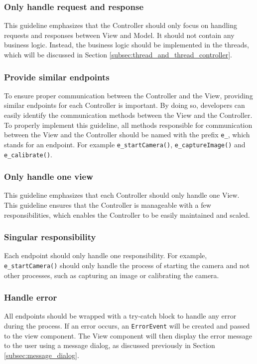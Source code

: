 \subsubsection{Only handle request and response}
This guideline emphasizes that the Controller should only focus on handling requests and responses between View and Model. It should not contain any business logic. Instead, the business logic should be implemented in the threads, which will be discussed in Section \ref{subsec:thread_and_thread_controller}.

\subsubsection{Provide similar endpoints}
To ensure proper communication between the Controller and the View, providing similar endpoints for each Controller is important. By doing so, developers can easily identify the communication methods between the View and the Controller. To properly implement this guideline, all methods responsible for communication between the View and the Controller should be named with the prefix \texttt{e\_}, which stands for an endpoint. For example \texttt{e\_startCamera()}, \texttt{e\_captureImage()} and \texttt{e\_calibrate()}.

\subsubsection{Only handle one view}
This guideline emphasizes that each Controller should only handle one View. This guideline ensures that the Controller is manageable with a few responsibilities, which enables the Controller to be easily maintained and scaled.

\subsubsection{Singular responsibility}
Each endpoint should only handle one responsibility. For example, \texttt{e\_startCamera()} should only handle the process of starting the camera and not other processes, such as capturing an image or calibrating the camera.

\subsubsection{Handle error}
All endpoints should be wrapped with a try-catch block to handle any error during the process. If an error occurs, an \texttt{ErrorEvent} will be created and passed to the view component. The View component will then display the error message to the user using a message dialog, as discussed previously in Section \ref{subsec:message_dialog}.

